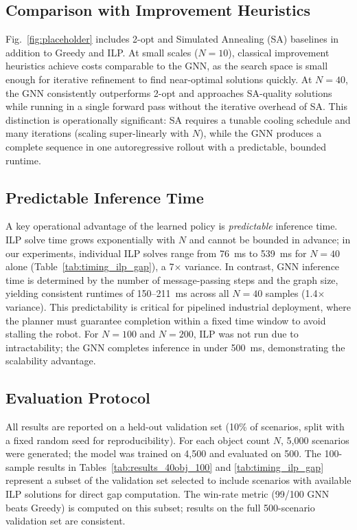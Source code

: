 \documentclass[conference]{IEEEtran}
\begin{document}
\subsection{Comparison with Improvement Heuristics}
Fig.~\ref{fig:placeholder} includes 2-opt and Simulated Annealing (SA) baselines in addition to Greedy and ILP. At small scales ($N{=}10$), classical improvement heuristics achieve costs comparable to the GNN, as the search space is small enough for iterative refinement to find near-optimal solutions quickly. At $N{=}40$, the GNN consistently outperforms 2-opt and approaches SA-quality solutions while running in a single forward pass without the iterative overhead of SA. This distinction is operationally significant: SA requires a tunable cooling schedule and many iterations (scaling super-linearly with $N$), while the GNN produces a complete sequence in one autoregressive rollout with a predictable, bounded runtime.

\subsection{Predictable Inference Time}
A key operational advantage of the learned policy is \emph{predictable} inference time. ILP solve time grows exponentially with $N$ and cannot be bounded in advance; in our experiments, individual ILP solves range from 76~ms to 539~ms for $N{=}40$ alone (Table~\ref{tab:timing_ilp_gap}), a 7$\times$ variance. In contrast, GNN inference time is determined by the number of message-passing steps and the graph size, yielding consistent runtimes of 150--211~ms across all $N{=}40$ samples (1.4$\times$ variance). This predictability is critical for pipelined industrial deployment, where the planner must guarantee completion within a fixed time window to avoid stalling the robot. For $N{=}100$ and $N{=}200$, ILP was not run due to intractability; the GNN completes inference in under 500~ms, demonstrating the scalability advantage.

\subsection{Evaluation Protocol}
All results are reported on a held-out validation set (10\% of scenarios, split with a fixed random seed for reproducibility). For each object count $N$, 5,000 scenarios were generated; the model was trained on 4,500 and evaluated on 500. The 100-sample results in Tables~\ref{tab:results_40obj_100} and \ref{tab:timing_ilp_gap} represent a subset of the validation set selected to include scenarios with available ILP solutions for direct gap computation. The win-rate metric (99/100 GNN beats Greedy) is computed on this subset; results on the full 500-scenario validation set are consistent.
\end{document}
